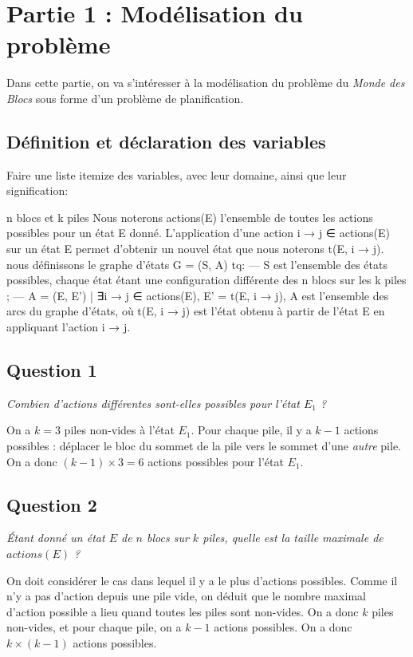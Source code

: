 
\section{Partie 1 : Modélisation du problème}

Dans cette partie, on va s'intéresser à la modélisation du problème du \textit{Monde des Blocs} sous forme d'un problème de planification.

\subsection{Définition et déclaration des variables}
Faire une liste itemize des variables, avec leur domaine, ainsi que leur signification:

n blocs et k piles
Nous noterons actions(E) l'ensemble de toutes les actions possibles pour
un état E donné.
L'application d'une action i → j ∈ actions(E) sur un état E permet d'obtenir un nouvel état que nous noterons
t(E, i → j).
nous déﬁnissons le graphe d'états G = (S, A) tq:
— S est l'ensemble des états possibles, chaque état étant une conﬁguration différente des n blocs sur les k piles ;
— A = {(E, E') | ∃i → j ∈ actions(E), E' = t(E, i → j)}, A est l'ensemble des arcs du graphe d'états, où t(E, i → j) est l'état obtenu à partir de l'état E en appliquant l'action i → j.

\subsection{Question 1}

\textit{Combien d'actions différentes sont-elles possibles pour l'état $E_1$ ?}

On a $k = 3$ piles non-vides à l'état $E_1$. Pour chaque pile, il y a $k - 1$ actions possibles : déplacer le bloc du sommet de la pile vers le sommet d'une \textit{autre} pile. On a donc $(k - 1) \times 3 = 6$ actions possibles pour l'état $E_1$.

\subsection{Question 2}
\textit{Étant donné un état $E$ de $n$ blocs sur $k$ piles, quelle est la taille maximale de $actions(E)$ ?}

On doit considérer le cas dans lequel il y a le plus d'actions possibles. Comme il n'y a pas d'action depuis une pile vide, on déduit que le nombre maximal d'action possible a lieu quand toutes les piles sont non-vides. On a donc $k$ piles non-vides, et pour chaque pile, on a $k - 1$ actions possibles. On a donc $k \times (k - 1)$ actions possibles.

